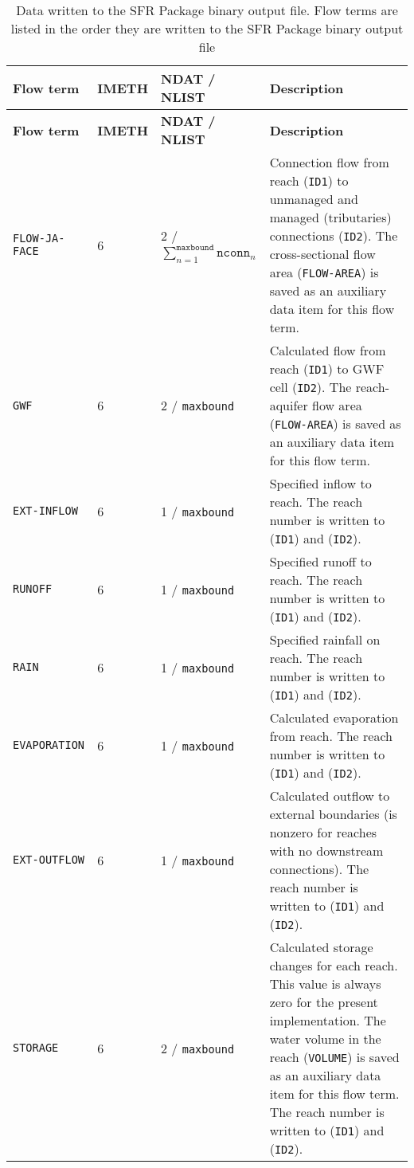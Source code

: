 \newpage
\begin{longtable}{p{3.5cm} p{2cm} p{3.5cm} p{6.5cm}}
\caption{Data written to the SFR Package binary output file. Flow terms are listed in the order they are written to the SFR Package binary output file} \tabularnewline
\hline
\hline
\textbf{Flow term} & \textbf{IMETH} & \textbf{NDAT / NLIST} & \textbf{Description} \\
\hline
\endfirsthead

\hline
\hline
\textbf{Flow term} & \textbf{IMETH} & \textbf{NDAT / NLIST} & \textbf{Description} \\
\hline
\endhead

\hline
\endfoot

\texttt{FLOW-JA-FACE} & 6 & 2 / $\sum_{n=1}^{\texttt{maxbound}} \texttt{nconn}_n$  & Connection flow from reach (\texttt{ID1}) to unmanaged and managed (tributaries) connections (\texttt{ID2}). The cross-sectional flow area (\texttt{FLOW-AREA}) is saved as an auxiliary data item for this flow term. \\
\texttt{GWF} & 6 & 2 / \texttt{maxbound} & Calculated flow from reach (\texttt{ID1}) to GWF cell (\texttt{ID2}). The reach-aquifer flow area (\texttt{FLOW-AREA}) is saved as an auxiliary data item for this flow term.\\
\texttt{EXT-INFLOW} & 6 & 1 / \texttt{maxbound} & Specified inflow to reach. The reach number is written to (\texttt{ID1}) and (\texttt{ID2}). \\
\texttt{RUNOFF} & 6 & 1 / \texttt{maxbound} & Specified runoff to reach. The reach number is written to (\texttt{ID1}) and (\texttt{ID2}). \\
\texttt{RAIN} & 6 & 1 / \texttt{maxbound} & Specified rainfall on reach. The reach number is written to (\texttt{ID1}) and (\texttt{ID2}). \\
\texttt{EVAPORATION} & 6 & 1 / \texttt{maxbound} & Calculated evaporation from reach. The reach number is written to (\texttt{ID1}) and (\texttt{ID2}). \\
\texttt{EXT-OUTFLOW} & 6 & 1 / \texttt{maxbound} & Calculated outflow to external boundaries (is nonzero for reaches with no downstream connections). The reach number is written to (\texttt{ID1}) and (\texttt{ID2}). \\
\texttt{STORAGE} & 6 & 2 / \texttt{maxbound} & Calculated storage changes for each reach.  This value is always zero for the present implementation.  The water volume in the reach (\texttt{VOLUME}) is saved as an auxiliary data item for this flow term.  The reach number is written to (\texttt{ID1}) and (\texttt{ID2}). \\

\end{longtable}
